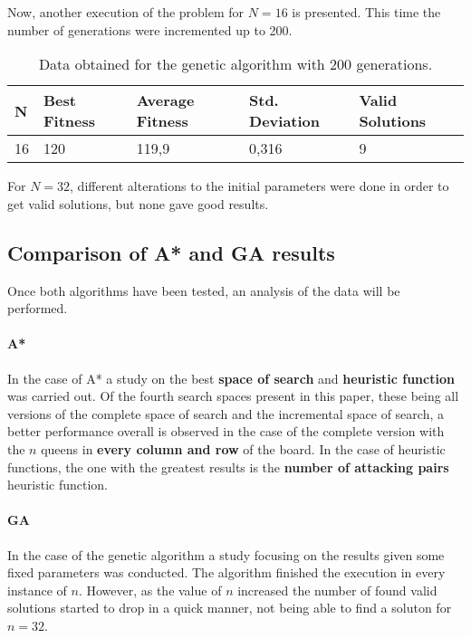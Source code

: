 \documentclass[]{llncs}
\begin{document}
Now, another execution of the problem for $N=16$ is presented. This time the number of generations were incremented up to 200.

\begin{table}[H]
    \caption{Data obtained for the genetic algorithm with 200 generations.}
    \centering
    \begin{tabular}{|l|l|l|l|l|}
        \hline
        N  & Best Fitness & Average Fitness & Std. Deviation & Valid Solutions      \\ \hline
        16 & 120          & 119,9           & 0,316          & 9                    \\ \hline
    \end{tabular}
    \label{tab:ag-data-2}
\end{table}

For $N=32$, different alterations to the initial parameters were done in order to get valid solutions, but none gave good results.
\subsection{Comparison of A* and GA results}\label{comparison_astar_gen}
Once both algorithms have been tested, an analysis of the data will be performed.

\paragraph{A*} 
In the case of A* a study on the best \textbf{space of search} and \textbf{heuristic function} was carried out. Of the fourth search spaces present in this paper, these being all versions of the complete space of search and the incremental space of search, a better performance overall is observed in the case of the complete version with the $n$ queens in \textbf{every column and row} of the board. In the case of heuristic functions, the one with the greatest results is the \textbf{number of attacking pairs} heuristic function.

\paragraph{GA}
In the case of the genetic algorithm a study focusing on the results given some fixed parameters was conducted. The algorithm finished the execution in every instance of $n$. However, as the value of $n$ increased the number of found valid solutions started to drop in a quick manner, not being able to find a soluton for $n = 32$. 
\end{document}
